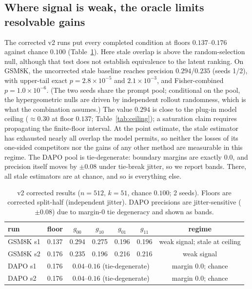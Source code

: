 \documentclass[11pt]{article}
\newcommand{\goo}{g_{00}}
\newcommand{\gto}{g_{10}}
\newcommand{\got}{g_{01}}
\newcommand{\gtt}{g_{11}}
\begin{document}
\subsection{Where signal is weak, the oracle limits resolvable gains}

The corrected v2 runs put every completed condition at floors
$0.137$--$0.176$ against chance $0.100$ (Table~\ref{tab:v2}). Here stale
overlap is above the random-selection null, although that test does not
establish equivalence to the latent ranking. On
GSM8K, the uncorrected stale baseline reaches precision $0.294$/$0.235$
(seeds 1/2), with upper-tail exact $p=2.8\times10^{-5}$ and
$2.1\times10^{-3}$, and Fisher-combined $p=1.0\times10^{-6}$. (The two seeds
share the prompt pool; conditional on the pool, the hypergeometric nulls are
driven by independent rollout randomness, which is what the combination
assumes.) The value $0.294$ is close to the plug-in model ceiling
(${\approx}0.30$ at floor $0.137$; Table~\ref{tab:ceiling}); a saturation
claim requires propagating the finite-floor interval. At the point estimate,
the stale estimator has exhausted nearly all overlap the model permits, so
neither the losses of its one-sided competitors nor the gains of any other
method are measurable in this regime. The DAPO pool is tie-degenerate:
boundary margins are exactly $0.0$, and precision itself moves by $\pm 0.08$
under tie-break jitter, so we report bands. There, all stale estimators are
at chance, and so is everything else.

\begin{table}[t]
\centering
\caption{v2 corrected results ($n{=}512$, $k{=}51$, chance $0.100$; 2 seeds).
Floors are corrected split-half (independent jitter). DAPO precisions are
jitter-sensitive ($\pm0.08$) due to margin-0 tie degeneracy and shown as
bands.}
\label{tab:v2}
\begin{tabular}{llccccc}
\toprule
run & floor & $\goo$ & $\gto$ & $\got$ & $\gtt$ & regime\\
\midrule
GSM8K s1 & 0.137 & 0.294 & 0.275 & 0.196 & 0.196 & weak signal; stale at ceiling\\
GSM8K s2 & 0.176 & 0.235 & 0.196 & 0.216 & 0.216 & weak signal\\
DAPO s1 & 0.176 & \multicolumn{4}{c}{$0.04$--$0.16$ (tie-degenerate)} & margin $0.0$; chance\\
DAPO s2 & 0.176 & \multicolumn{4}{c}{$0.04$--$0.16$ (tie-degenerate)} & margin $0.0$; chance\\
\bottomrule
\end{tabular}
\end{table}
\end{document}
